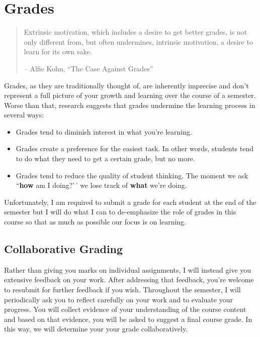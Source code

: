 \documentclass[
  letterpaper,
  DIV=11,
  numbers=noendperiod]{scrreprt}
\begin{document}
\chapter{Grades}\label{grades}

\begin{quote}
Extrinsic motivation, which includes a desire to get better grades, is
not only different from, but often undermines, intrinsic motivation, a
desire to learn for its own sake.

-- Alfie Kohn, ``The Case Against Grades''
\end{quote}

Grades, as they are traditionally thought of, are inherently imprecise
and don't represent a full picture of your growth and learning over the
course of a semester. Worse than that, research suggests that grades
undermine the learning process in several ways:

\begin{itemize}
\item
  Grades tend to diminish interest in what you're learning.
\item
  Grades create a preference for the easiest task. In other words,
  students tend to do what they need to get a certain grade, but no
  more.
\item
  Grades tend to reduce the quality of student thinking. The moment we
  ask ``\textbf{how} am I doing?'\,' we lose track of \textbf{what}
  we're doing.
\end{itemize}

Unfortunately, I am required to submit a grade for each student at the
end of the semester but I will do what I can to de-emphasize the role of
grades in this course so that as much as possible our focus is on
learning.

\section*{Collaborative Grading}\label{collaborative-grading}


Rather than giving you marks on individual assignments, I will instead
give you extensive feedback on your work. After addressing that
feedback, you're welcome to resubmit for further feedback if you wish.
Throughout the semester, I will periodically ask you to reflect
carefully on your work and to evaluate your progress. You will collect
evidence of your understanding of the course content and based on that
evidence, you will be asked to suggest a final course grade. In this
way, we will determine your your grade collaboratively.
\end{document}
